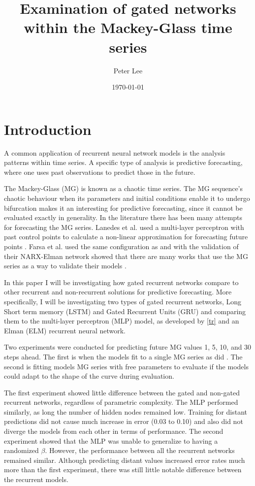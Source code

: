 \documentclass[11pt]{article}
\author{Peter Lee}
\date{\today}
\title{Examination of gated networks within the Mackey-Glass time series}
\begin{document}
\maketitle

\section{Introduction}
A common application of recurrent neural network models is the
analysis patterns within time series. A specific
type of analysis is predictive forecasting, where one uses past
observations to predict those in the future. 

The Mackey-Glass (MG) \cite{MG} is known as a chaotic time series.
The MG sequence's chaotic behaviour when its parameters and initial
conditions enable it to undergo bifurcation makes it an interesting
for predictive forecasting, since it cannot be evaluated exactly
in generality. In the literature there has been many attempts for forecasting the MG
series. Lanedes et al. used a multi-layer perceptron with past control
points to calculate a non-linear approximation for forecasting future
points \cite{tr}. Farsa et al. used the same configuration as
\cite{tr} and with the validation of their NARX-Elman network showed
that there are many works that use the MG series as a way to validate
their models \cite{Farsa}.

In this paper I will be investigating how gated recurrent networks
compare to other recurrent and non-recurrent solutions for predictive
forecasting. More specifically, I will be investigating two types of
gated recurrent networks, Long Short term memory (LSTM) \cite{LSTM}
and Gated Recurrent Units (GRU) \cite{GRU} and comparing them to the
multi-layer perceptron (MLP) model, as developed by \ref{tr} and an
Elman (ELM) recurrent neural network.

Two experiments were conducted for predicting future MG values 1, 5,
10, and 30 steps ahead. The first is when the models fit to a single
MG series as did \cite{tr,}. The second is fitting models MG series with
free parameters to evaluate if the models could adapt to the shape of
the curve during evaluation. 

The first experiment showed little difference between the gated and
non-gated recurrent networks, regardless of parametric complexity. The
MLP performed similarly, as long the number of hidden nodes
remained low. Training for distant predictions did not cause much
increase in error (0.03 to 0.10) and also did not diverge the
models from each other in terms of performance. The second experiment showed that the MLP was unable to generalize to
having a randomized $\beta$. However, the performance between all the
recurrent networks remained similar. Although predicting distant
values increased error rates much more than the first experiment,
there was still little notable difference between the recurrent
models.
\end{document}
